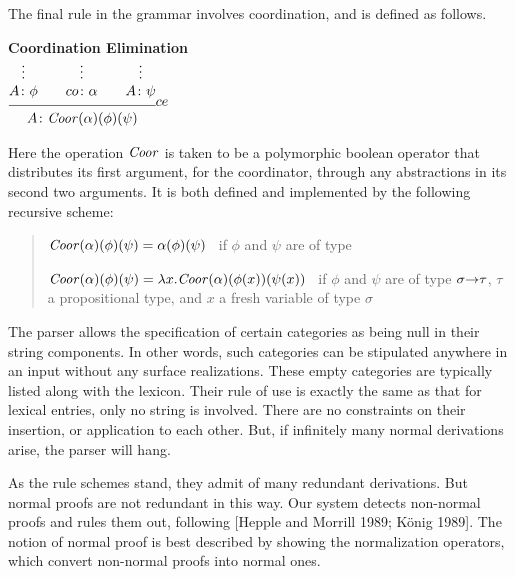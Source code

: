 The final rule in the grammar involves coordination, and is defined as
follows.  
%
\begin{center}
{\bf Coordination Elimination} \\[6pt]
{\small
$\infr{\dotsover{\synsem{A}{\phi}} 
       \qquad \dotsover{\synsem{co}{\alpha}}
       \qquad \dotsover{\synsem{A}{\psi}}}
      {\synsem{A}{\mf{Coor}(\alpha)(\phi)(\psi)}}
      {\coel}$
}
\end{center}
%
Here the operation $\mbox{\it Coor\/}$ is taken to be a polymorphic boolean
operator that distributes its first argument, for the coordinator,
through any abstractions in its second two arguments.  It is both defined
and implemented by the following recursive scheme:
%
\begin{quote}
\begin{mathexamples}
\item  
$\mbox{\it Coor\/}(\alpha)(\phi)(\psi) = \alpha(\phi)(\psi)$ 
 \ if $\phi$ and $\psi$        are of type 
\item
$\mbox{\it Coor\/}(\alpha)(\phi)(\psi) =
 \lambda x . \mbox{\it Coor\/}(\alpha)(\phi(x))(\psi(x))$
 \ if $\phi$ and $\psi$ are of type $\sigma{\rightarrow}\tau$, 
$\tau$ a propositional type, and $x$ a fresh variable of type
$\sigma$
\end{mathexamples}
\end{quote}
%




The parser allows the specification of certain categories as being
null in their string components.  In other words, such categories can
be stipulated anywhere in an input without any surface realizations.
These empty categories are typically listed along with the lexicon.
Their rule of use is exactly the same as that for lexical entries,
only no string is involved.  There are no constraints on their
insertion, or application to each other.  But, if infinitely many
normal derivations arise, the parser will hang.



As the rule schemes stand, they admit of many redundant derivations.
But normal proofs are not redundant in this way.  Our system detects
non-normal proofs and rules them out, following [Hepple and Morrill
1989; K\"onig 1989].  The notion of normal proof is best described by
showing the normalization operators, which convert non-normal proofs
into normal ones.  

